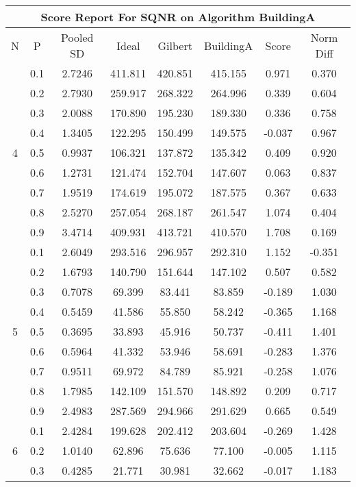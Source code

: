 \documentclass[11pt,a4paper]{report}
\begin{document}
\begin{longtable}{ | c | c || c | c | c | c | c | c | }
\hline
\multicolumn{8}{|c|}{ Score Report For SQNR on Algorithm BuildingA} \\
\hline
N & P & Pooled SD &  Ideal &  Gilbert & BuildingA  & Score & Norm Diff \\
 \hline
 \hline
 \endhead
\multirow{9}{*}{4} & 0.1 & 2.7246 & 411.811 & 420.851 & 415.155 & 0.971 & 0.370 \\
 & 0.2 & 2.7930 & 259.917 & 268.322 & 264.996 & 0.339 & 0.604 \\
 & 0.3 & 2.0088 & 170.890 & 195.230 & 189.330 & 0.336 & 0.758 \\
 & 0.4 & 1.3405 & 122.295 & 150.499 & 149.575 & -0.037 & 0.967 \\
 & 0.5 & 0.9937 & 106.321 & 137.872 & 135.342 & 0.409 & 0.920 \\
 & 0.6 & 1.2731 & 121.474 & 152.704 & 147.607 & 0.063 & 0.837 \\
 & 0.7 & 1.9519 & 174.619 & 195.072 & 187.575 & 0.367 & 0.633 \\
 & 0.8 & 2.5270 & 257.054 & 268.187 & 261.547 & 1.074 & 0.404 \\
 & 0.9 & 3.4714 & 409.931 & 413.721 & 410.570 & 1.708 & 0.169 \\
 \hline
\multirow{9}{*}{5} & 0.1 & 2.6049 & 293.516 & 296.957 & 292.310 & 1.152 & -0.351 \\
 & 0.2 & 1.6793 & 140.790 & 151.644 & 147.102 & 0.507 & 0.582 \\
 & 0.3 & 0.7078 & 69.399 & 83.441 & 83.859 & -0.189 & 1.030 \\
 & 0.4 & 0.5459 & 41.586 & 55.850 & 58.242 & -0.365 & 1.168 \\
 & 0.5 & 0.3695 & 33.893 & 45.916 & 50.737 & -0.411 & 1.401 \\
 & 0.6 & 0.5964 & 41.332 & 53.946 & 58.691 & -0.283 & 1.376 \\
 & 0.7 & 0.9511 & 69.972 & 84.789 & 85.921 & -0.258 & 1.076 \\
 & 0.8 & 1.7985 & 142.109 & 151.570 & 148.892 & 0.209 & 0.717 \\
 & 0.9 & 2.4983 & 287.569 & 294.966 & 291.629 & 0.665 & 0.549 \\
 \hline
\multirow{9}{*}{6} & 0.1 & 2.4284 & 199.628 & 202.412 & 203.604 & -0.269 & 1.428 \\
 & 0.2 & 1.0140 & 62.896 & 75.636 & 77.100 & -0.005 & 1.115 \\
 & 0.3 & 0.4285 & 21.771 & 30.981 & 32.662 & -0.017 & 1.183 \\

\end{longtable}
\end{document}
